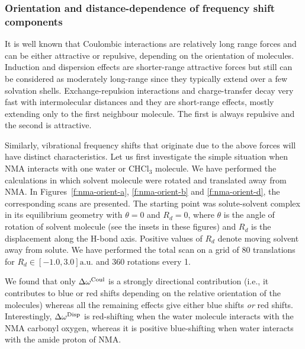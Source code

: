 \documentclass[a4paper,titlepage,twoside,fleqn,12pt]{book}
\begin{document}
\begin{refsection}
\subsubsection{Orientation and distance\hyp{}dependence of frequency shift components}

It is well known that Coulombic interactions are relatively long range forces
and can be either attractive or repulsive, depending on the orientation
of molecules.
Induction and dispersion effects are shorter\hyp{}range attractive forces but still
can be considered as moderately long\hyp{}range since they typically
extend over a few solvation shells. Exchange\hyp{}repulsion interactions
and charge\hyp{}transfer decay very fast with intermolecular distances
and they are short\hyp{}range effects, mostly extending only to the first
neighbour molecule. The first is always repulsive and the second is attractive.

Similarly, vibrational frequency shifts that originate due to the above
forces will have distinct characteristics. Let us first investigate
the simple situation when NMA interacts with one water or CHCl$_3$ molecule.
We have performed the calculations in which solvent molecule were rotated
and translated away from NMA. In Figures~\ref{f:nma-orient-a}, \ref{f:nma-orient-b}
and \ref{f:nma-orient-d}, the corresponding scans are presented.
The starting point was solute\hyp{}solvent complex in its equilibrium geometry
with $\theta=0$ and $R_d=0$, where $\theta$ is the angle of rotation of solvent
molecule (see the insets in these figures) and $R_d$ is the displacement along the H-bond axis.
Positive values of $R_d$ denote moving solvent away from solute. We have performed
the total scan on a grid of 80 translations for $R_d\in [-1.0,3.0]\text{a.u.}$ 
and 360 rotations every 1\textdegree.

We found that only $\Delta\omega^{\rm Coul}$ is a strongly directional
contribution (i.e., it contributes to blue or red shifts depending on the
relative orientation of the molecules) whereas all the remaining effects
give either blue shifts \emph{or} red shifts. Interestingly, $\Delta\omega^{\rm Disp}$
is red\hyp{}shifting when
the water molecule interacts with the NMA carbonyl oxygen,
whereas it is positive blue-shifting when water interacts with
the amide proton of NMA.


\end{refsection}
\end{document}
